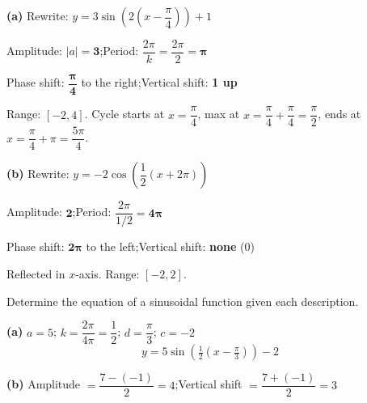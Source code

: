 \documentclass[addpoints]{exam}
\begin{document}
\begin{questions}
\begin{solution}[9cm]
\textbf{(a)} Rewrite: $y = 3\sin\!\left(2\!\left(x - \dfrac{\pi}{4}\right)\right) + 1$

Amplitude: $|a| = \mathbf{3}$;\quad Period: $\dfrac{2\pi}{k} = \dfrac{2\pi}{2} = \mathbf{\pi}$

Phase shift: $\mathbf{\dfrac{\pi}{4}}$ to the right;\quad Vertical shift: \textbf{1 up}

Range: $[-2, 4]$.
Cycle starts at $x = \dfrac{\pi}{4}$, max at $x = \dfrac{\pi}{4} + \dfrac{\pi}{4} = \dfrac{\pi}{2}$,
ends at $x = \dfrac{\pi}{4} + \pi = \dfrac{5\pi}{4}$.

\textbf{(b)} Rewrite: $y = -2\cos\!\left(\dfrac{1}{2}(x + 2\pi)\right)$

Amplitude: $\mathbf{2}$;\quad Period: $\dfrac{2\pi}{1/2} = \mathbf{4\pi}$

Phase shift: $\mathbf{2\pi}$ to the left;\quad Vertical shift: \textbf{none} (0)

Reflected in $x$-axis. Range: $[-2, 2]$.
\end{solution}

\question Determine the equation of a sinusoidal function given each description.
\begin{solution}[8cm]
\textbf{(a)} $a = 5$;\; $k = \dfrac{2\pi}{4\pi} = \dfrac{1}{2}$;\; $d = \dfrac{\pi}{3}$;\; $c = -2$
\[
y = 5\sin\!\left(\tfrac{1}{2}\!\left(x - \tfrac{\pi}{3}\right)\right) - 2
\]

\textbf{(b)} Amplitude $= \dfrac{7-(-1)}{2} = 4$;\quad Vertical shift $= \dfrac{7+(-1)}{2} = 3$


\end{solution}
\end{questions}
\end{document}
